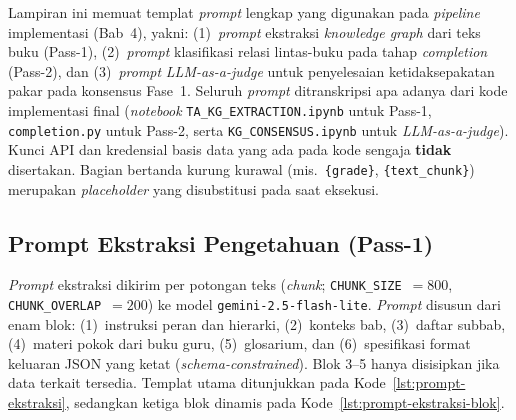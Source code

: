\documentclass[../../thesis]{subfiles}
\begin{document}
\ifSubfilesClassLoaded{}{\appendix\setcounter{chapter}{3}}

\label{lamp:prompt}

Lampiran ini memuat templat \textit{prompt} lengkap yang digunakan pada
\textit{pipeline} implementasi (Bab~4), yakni: (1)~\textit{prompt} ekstraksi
\textit{knowledge graph} dari teks buku (Pass-1), (2)~\textit{prompt}
klasifikasi relasi lintas-buku pada tahap \textit{completion} (Pass-2), dan
(3)~\textit{prompt} \textit{LLM-as-a-judge} untuk penyelesaian ketidaksepakatan
pakar pada konsensus Fase~1. Seluruh \textit{prompt} ditranskripsi apa adanya
dari kode implementasi final (\textit{notebook} \texttt{TA\_KG\_EXTRACTION.ipynb}
untuk Pass-1, \texttt{completion.py} untuk Pass-2, serta
\texttt{KG\_CONSENSUS.ipynb} untuk \textit{LLM-as-a-judge}).
Kunci API dan kredensial basis data yang ada pada
kode sengaja \textbf{tidak} disertakan. Bagian bertanda kurung kurawal
(mis.\ \texttt{\{grade\}}, \texttt{\{text\_chunk\}}) merupakan \textit{placeholder}
yang disubstitusi pada saat eksekusi.

\subsection{Prompt Ekstraksi Pengetahuan (Pass-1)}
\label{lamp:prompt-ekstraksi}

\textit{Prompt} ekstraksi dikirim per potongan teks (\textit{chunk};
\texttt{CHUNK\_SIZE}~$=800$, \texttt{CHUNK\_OVERLAP}~$=200$) ke model
\texttt{gemini-2.5-flash-lite}. \textit{Prompt} disusun dari enam blok: (1)~instruksi
peran dan hierarki, (2)~konteks bab, (3)~daftar subbab, (4)~materi pokok dari
buku guru, (5)~glosarium, dan (6)~spesifikasi format
keluaran JSON yang ketat (\textit{schema-constrained}). Blok 3--5 hanya
disisipkan jika data terkait tersedia. Templat utama ditunjukkan pada
Kode~\ref{lst:prompt-ekstraksi}, sedangkan ketiga blok dinamis pada
Kode~\ref{lst:prompt-ekstraksi-blok}.
\end{document}
